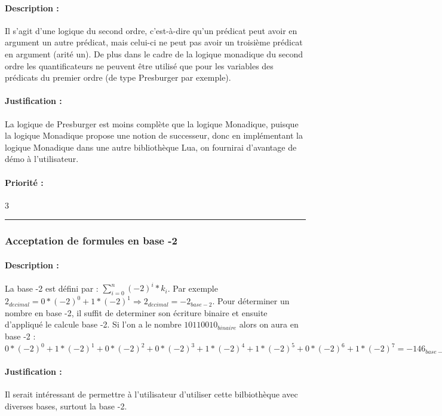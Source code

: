 \documentclass{article}%
\begin{document}
\paragraph{Description :} Il s'agit d'une logique du second ordre, c'est-à-dire qu'un prédicat peut avoir en argument un autre prédicat, mais celui-ci ne peut pas avoir un troisième prédicat en argument (arité un). De plus dans le cadre de la logique monadique du second ordre les quantificateurs ne peuvent être utilisé que pour les variables des prédicats du premier ordre (de type Presburger par exemple).

\paragraph{Justification :} La logique de Presburger est moins complète que la logique Monadique, puisque la logique Monadique propose une notion de successeur, donc en implémentant la logique Monadique dans une autre bibliothèque Lua, on fournirai d'avantage de démo à l'utilisateur.

\paragraph{Priorité :} 3\\

\rule{\linewidth}{1pt}

\subsubsection{Acceptation de formules en base -2}

\paragraph{Description :} La base -2 est défini par : $ \sum\limits_{i=0}^n (-2)^i * k_i$. Par exemple $2_{decimal} = 0 * (-2)^0 + 1 * (-2)^1 \Rightarrow 2_{decimal} = -2_{base - 2}$. Pour déterminer un nombre en base -2, il suffit de determiner son écriture binaire et ensuite d'appliqué le calcule base -2. Si l'on a le nombre $10110010_{binaire}$ alors on aura en base -2 : $0 * (-2)^0 + 1 * (-2)^1 + 0 * (-2)^2 + 0 * (-2)^3 + 1 * (-2)^4 + 1 * (-2)^5 + 0 * (-2)^6 + 1 * (-2)^7 = -146_{base - 2}$

\paragraph{Justification :} Il serait intéressant de permettre à l'utilisateur d'utiliser cette bilbiothèque avec diverses bases, surtout la base -2.
\end{document}

